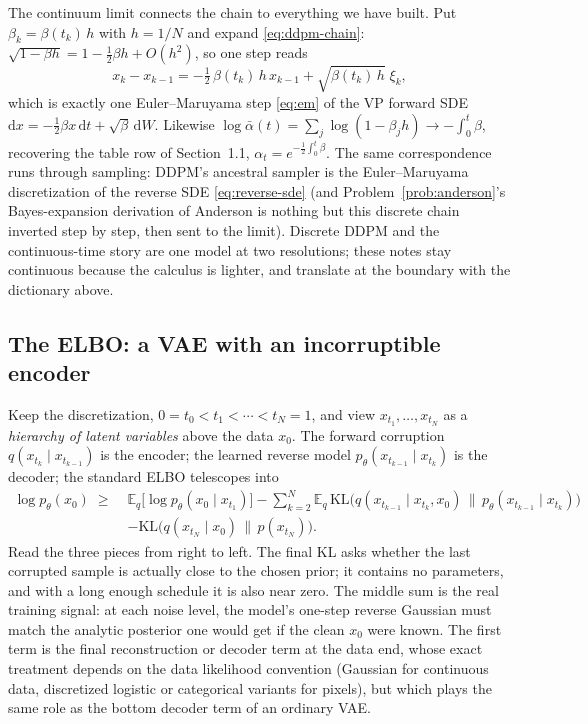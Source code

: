 \documentclass[10pt,a4paper]{article}
\newcommand{\E}{\mathbb{E}}
\newcommand{\dd}{\mathrm{d}}
\begin{document}
The continuum limit connects the chain to everything we have built. Put
$\beta_k = \beta(t_k)\, h$ with $h = 1/N$ and expand
\eqref{eq:ddpm-chain}:
$\sqrt{1 - \beta h} = 1 - \tfrac12 \beta h + O(h^2)$, so one step reads
\begin{equation}
x_k - x_{k-1}
= -\tfrac12\, \beta(t_k)\, h\, x_{k-1} + \sqrt{\beta(t_k)\, h}\;\xi_k ,
\end{equation}
which is exactly one Euler--Maruyama step \eqref{eq:em} of the VP
forward SDE $\dd x = -\tfrac12 \beta x\, \dd t + \sqrt{\beta}\, \dd W$.
Likewise $\log \bar\alpha(t) = \sum_{j} \log(1 - \beta_j h)
\to -\int_0^t \beta$, recovering the table row of Section~1.1,
$\alpha_t = e^{-\frac12 \int_0^t \beta}$. The same correspondence runs
through sampling: DDPM's ancestral sampler is the Euler--Maruyama
discretization of the reverse SDE \eqref{eq:reverse-sde} (and
Problem~\ref{prob:anderson}'s Bayes-expansion derivation of Anderson is
nothing but this discrete chain inverted step by step, then sent to the
limit). Discrete DDPM and the continuous-time story are one model at two
resolutions; these notes stay continuous because the calculus is
lighter, and translate at the boundary with the dictionary above.

\subsection{The ELBO: a VAE with an incorruptible encoder}

Keep the discretization,
$0 = t_0 < t_1 < \cdots < t_N = 1$, and view
$x_{t_1}, \ldots, x_{t_N}$ as a \emph{hierarchy of latent variables} above
the data $x_0$. The forward corruption $q(x_{t_{k}} \mid x_{t_{k-1}})$ is
the encoder; the learned reverse model
$p_\theta(x_{t_{k-1}} \mid x_{t_k})$ is the decoder; the standard ELBO
telescopes into
\begin{equation}
\begin{aligned}
\log p_\theta(x_0) \;\geq\;&
\E_q\Big[ \log p_\theta(x_0 \mid x_{t_1}) \Big]
- \sum_{k=2}^{N}
\E_q\, \mathrm{KL}\Big(
q(x_{t_{k-1}} \mid x_{t_k}, x_0)
\,\big\|\, p_\theta(x_{t_{k-1}} \mid x_{t_k}) \Big)
\\
&- \mathrm{KL}\big( q(x_{t_N} \mid x_0) \,\|\, p(x_{t_N}) \big).
\end{aligned}
\label{eq:elbo}
\end{equation}
Read the three pieces from right to left. The final KL asks whether the
last corrupted sample is actually close to the chosen prior; it contains
no parameters, and with a long enough schedule it is also near zero. The middle sum is the real
training signal: at each noise level, the model's one-step reverse
Gaussian must match the analytic posterior one would get if the clean
$x_0$ were known. The first term is the final reconstruction or decoder
term at the data end, whose exact treatment depends on the data
likelihood convention (Gaussian for continuous data, discretized
logistic or categorical variants for pixels), but which plays the same
role as the bottom decoder term of an ordinary VAE.
\end{document}
